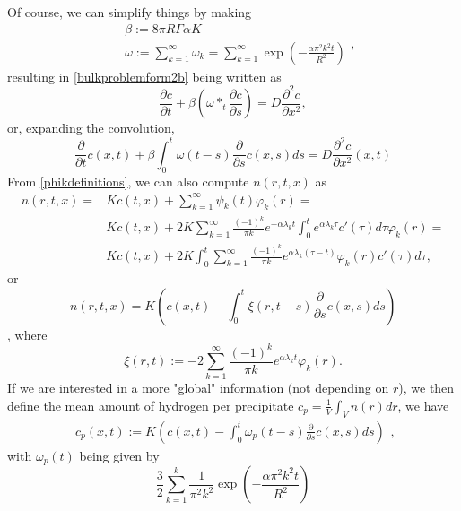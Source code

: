 \documentclass[]{article}
\newcommand{\pderiv}[2]{\frac{\partial #1}{\partial #2}}
\begin{document}
Of course, we can simplify things by making
\begin{equation}\label{auxiliarydefinitions2}
	\begin{split}
	& \beta := 8 \pi R \Gamma \alpha K \\
	& \omega := \sum_{k=1}^\infty \omega_k = \sum_{k=1}^\infty \exp \left( -\frac{\alpha \pi^2 k^2 t}{R^2} \right)
	\end{split},
\end{equation}
resulting in \eqref{bulkproblemform2b} being written as
\begin{equation}\label{bulkproblemform2}
	\pderiv{c}{t} + \beta \left(\omega *_t \pderiv{c}{s}\right) = D \frac{\partial^2 c}{\partial x^2},
\end{equation}
or, expanding the convolution,
\begin{equation}\label{bulkproblemform3}
	\pderiv{}{t} c(x, t) + \beta \int_0^t \omega(t - s) \pderiv{}{s} c(x, s) ds = D \frac{\partial^2 c}{\partial x^2}(x,t)
\end{equation}
From \eqref{phikdefinitions}, we can also compute $n(r, t, x)$ as
\begin{equation}
	\begin{split}
	n(r,t,x) = & K c(t, x) + \sum_{k=1}^\infty \psi_k(t) \varphi_k(r) = \\
	& K c(t, x) + 2 K \sum_{k=1}^\infty \frac{(-1)^k}{\pi k} e^{-\alpha \lambda_k t} \int_0^t e^{\alpha \lambda_k \tau} c'(\tau) d \tau \varphi_k(r) = \\
	& K c(t,x) + 2 K \int_0^t \sum_{k=1}^\infty \frac{(-1)^k}{\pi k} e^{\alpha \lambda_k (\tau-t)} \varphi_k(r) c'(\tau) d \tau,
	\end{split}
\end{equation}
or
\begin{equation}
n(r,t,x) = K \left(c(x, t) - \int_0^t \xi(r, t - s) \pderiv{}{s} c(x, s) ds\right)
\end{equation},
where
\begin{equation}
	\xi(r, t) := -2 \sum_{k=1}^\infty \frac{(-1)^k}{\pi k} e^{\alpha \lambda_k t} \varphi_k(r).
\end{equation}
If we are interested in a more "global" information (not depending on $r$), we then define the mean amount of hydrogen per precipitate $c_p = \frac{1}{V} \int_V n(r) dr$, we have
\begin{equation}
	\begin{split}
	c_p(x, t) := K \left( c(x,t) - \int_0^t \omega_p(t-s) \pderiv{}{s} c(x, s) ds \right)
	\end{split},
\end{equation}
with $\omega_p(t)$ being given by
\begin{equation}
	\frac{3}{2} \sum_{k=1}^k \frac{1}{\pi^2 k^2} \exp \left( -\frac{\alpha \pi^2 k^2 t}{R^2} \right)
\end{equation}
\end{document}
